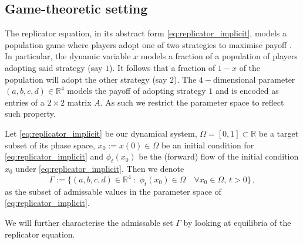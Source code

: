 \documentclass[../main.tex]{subfiles}
\begin{document}
\subsection{Game-theoretic setting}\label{subsec:aut_setting}

The replicator equation, in its abstract form \eqref{eq:replicator_implicit}, models a population game where players adopt one of two strategies to maximise payoff \cite{Zino25}.
In particular, the dynamic variable $x$ models a fraction of a population of players adopting said strategy (say $1$).
It follows that a fraction of $1-x$ of the population will adopt the other strategy (say $2$).
The $4-$dimensional parameter $(a,b,c,d)\in \mathbb{R}^{4}$ models the payoff of adopting strategy $1$ and is encoded as entries of a $2\times2$ matrix $A$.
As such we restrict the parameter space to reflect such property.
\begin{definition}\label{def:admissable_set}
        Let \eqref{eq:replicator_implicit} be our dynamical system, $\Omega=[0,1]\subset \mathbb{R}$ be a target subset of its phase space, $x_{0}:=x(0)\in\Omega$ be an initial condition for \eqref{eq:replicator_implicit} and $\phi_{t}(x_{0})$ be the (forward) flow of the initial condition $x_{0}$ under \eqref{eq:replicator_implicit}.
        Then we denote
        \begin{equation*}
                \Gamma := \{(a,b,c,d)\in \mathbb{R}^{4}\;:\; \phi_{t}(x_{0})\in\Omega \quad\forall x_{0}\in\Omega,\,t>0\}\,,
        \end{equation*}
        as the subset of admissable values in the parameter space of \eqref{eq:replicator_implicit}.
\end{definition}
We will further characterise the admissable set $\Gamma$ by looking at equilibria of the replicator equation.



\end{document}
